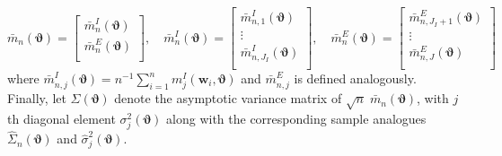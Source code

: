 \begin{equation}
  \bar{m}_n(\boldsymbol{\vartheta}) = \left[
  \begin{array}{c}
   \bar{m}_n^I(\boldsymbol{\vartheta}) \\
   \bar{m}_n^E(\boldsymbol{\vartheta}) \\
  \end{array}
\right], \quad
  \bar{m}_n^I(\boldsymbol{\vartheta}) = \left[
  \begin{array}{c}
    \bar{m}_{n,1}^I(\boldsymbol{\vartheta})\\
    \vdots \\
    \bar{m}_{n,J_I}^I(\boldsymbol{\vartheta})\\
  \end{array}
\right], \quad
  \bar{m}_n^E(\boldsymbol{\vartheta}) = \left[
  \begin{array}{c}
    \bar{m}_{n,J_I+1}^E(\boldsymbol{\vartheta})\\
    \vdots \\
    \bar{m}_{n,J}^E(\boldsymbol{\vartheta})\\
  \end{array}
\right]
\end{equation}
where 
$\bar{m}^I_{n,j}(\boldsymbol{\vartheta}) = n^{-1} \sum_{i=1}^{n} m_j^I(\mathbf{w}_i, \boldsymbol{\vartheta})$
and $\bar{m}^E_{n,j}$ is defined analogously.
Finally, let $\Sigma(\boldsymbol{\vartheta})$ denote the asymptotic variance matrix of $\sqrt{n}\; \bar{m}_n(\boldsymbol{\vartheta})$, with $j$th diagonal element $\sigma^2_j(\boldsymbol{\vartheta})$ along with the corresponding sample analogues $\widehat{\Sigma}_n(\boldsymbol{\vartheta})$ and $\widehat{\sigma}^2_j(\boldsymbol{\vartheta})$.

